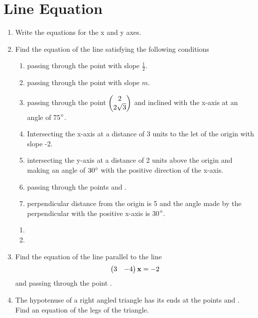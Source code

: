\documentclass[journal,12pt,twocolumn]{IEEEtran}
\renewcommand\thesection{\arabic{section}}
\begin{document}
\section{Line Equation}
\renewcommand{\theequation}{\theenumi}
\begin{enumerate}[label=\thesection.\arabic*.,ref=\thesection.\theenumi]
\item Write the equations for the x and y axes.
\item Find the equation of the line satisfying the following conditions 
\begin{enumerate}
\item passing through  the point  with slope $\frac{1}{2}$.
\item passing through the point  with slope $m$.
\item passing through the point $\begin{pmatrix}2\\2\sqrt{3}\end{pmatrix}$ and inclined with the x-axis at an angle of 75$\degree$.
\item Intersecting the x-axis at a distance of 3 units to the let of the origin with slope -2.
\item intersecting the y-axis at a distance of 2 units above the origin and making an angle of $30\degree$ with the positive direction of the x-axis.
\item passing through the points  and .
\item perpendicular distance from the origin is 5 and the angle made by the perpendicular with the positive x-axis is 30$\degree$.
\end{enumerate}
%
\solution
\begin{enumerate}
\item %
\item %
\end{enumerate}
\item Find the equation of the line parallel to the line 
\begin{align}
\begin{pmatrix}3 & -4\end{pmatrix}\mathbf{x} = -2
\end{align}
%
and passing through the point .
%
\item The hypotenuse of a right angled triangle has its ends at the points  and . Find an equation of the legs of the triangle.


\end{enumerate}
\end{document}
